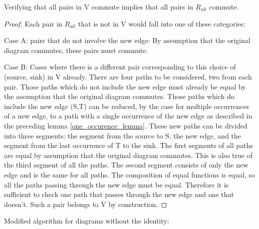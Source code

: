 \documentclass[runningheads]{llncs}
\begin{document}
\begin{theorem}
\label{verifyingSet}
Verifying that all pairs in V commute implies that all pairs in $R_{all}$ commute.
\end{theorem}
\begin{proof}

Each pair in $R_{all}$ that is not in V would fall into one of these categories:

Case A: pairs that do not involve the new edge: By assumption that the original diagram commutes, these pairs must commute.

Case B: Cases where there is a different pair corresponding to this choice of (source, sink) in V already.
There are four paths to be considered, two from each pair. Those paths which do not include the new edge must already be equal by the assumption that the original diagram commutes.
Those paths which do include the new edge (S,T) can be reduced, by the case for multiple occurrences of a new edge, to a path with a single occurrence of the new edge as described in the preceding lemma \ref{one_occurence_lemma}. These new paths can be divided into three segments: the segment from the source to S, the new edge, and the segment from the last occurrence of T to the sink. The first segments of all paths are equal by assumption that the original diagram commutes. This is also true of the third segment of all the paths. The second segment consists of only the new edge and is the same for all paths. The composition of equal functions is equal, so all the paths passing through the new edge must be equal.
Therefore it is sufficient to check one path that passes through the new edge and one that doesn't. Such a pair belongs to V by construction.
\end{proof}

Modified algorithm for diagrams without the identity:
\end{document}
